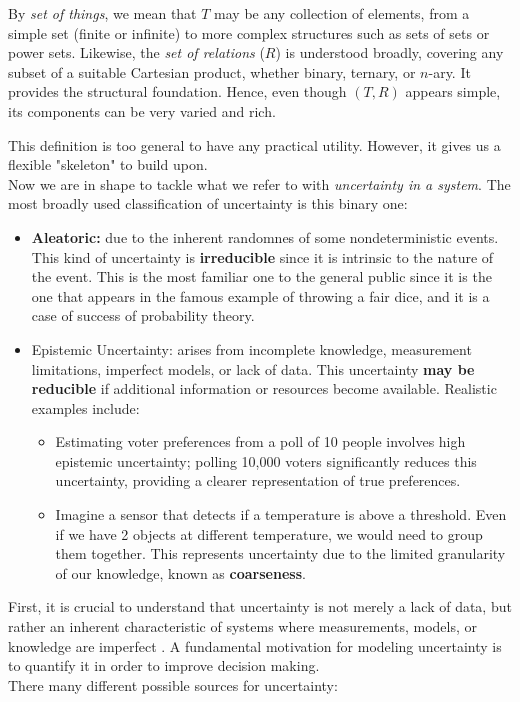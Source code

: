 \begin{remark}
    By \emph{set of things}, we mean that \(T\) may be any collection of elements, from a simple set (finite or infinite) to more complex structures such as sets of sets or power sets. Likewise, the \emph{set of relations} (\(R\)) is understood broadly, covering any subset of a suitable Cartesian product, whether binary, ternary, or \(n\)-ary. It provides the structural foundation. Hence, even though \((T, R)\) appears simple, its components can be very varied and rich.
\end{remark}

This definition is too general to have any practical utility. However, it gives us a flexible "skeleton" to build upon.\\

Now we are in shape to tackle what we refer to with \textit{uncertainty in a system}. The most broadly used classification of uncertainty is this binary one:
\begin{itemize}
    \item \textbf{Aleatoric:} due to the inherent randomnes of some nondeterministic events. This kind of uncertainty is \textbf{irreducible} since it is intrinsic to the nature of the event. This is the most familiar one to the general public since it is the one that appears in the famous example of throwing a fair dice, and it is a case of success of probability theory.
    \item Epistemic Uncertainty: arises from incomplete knowledge, measurement limitations, imperfect models, or lack of data. This uncertainty \textbf{may be reducible} if additional information or resources become available. Realistic examples include: 
    \begin{itemize} 
        \item Estimating voter preferences from a poll of 10 people involves high epistemic uncertainty; polling 10,000 voters significantly reduces this uncertainty, providing a clearer representation of true preferences. 
        \item Imagine a sensor that detects if a temperature is above a threshold. Even if we have 2 objects at different temperature, we would need to group them together. 
        This represents uncertainty due to the limited granularity of our knowledge, known as \textbf{coarseness}.
    \end{itemize} 
\end{itemize}

First, it is crucial to understand that uncertainty is not merely a lack of data, but rather an inherent characteristic of systems where measurements, models, or knowledge are imperfect \cite{UncertaintySciences}. A fundamental motivation for modeling uncertainty is to quantify it in order to improve decision making.\\

There many different possible sources for uncertainty: 